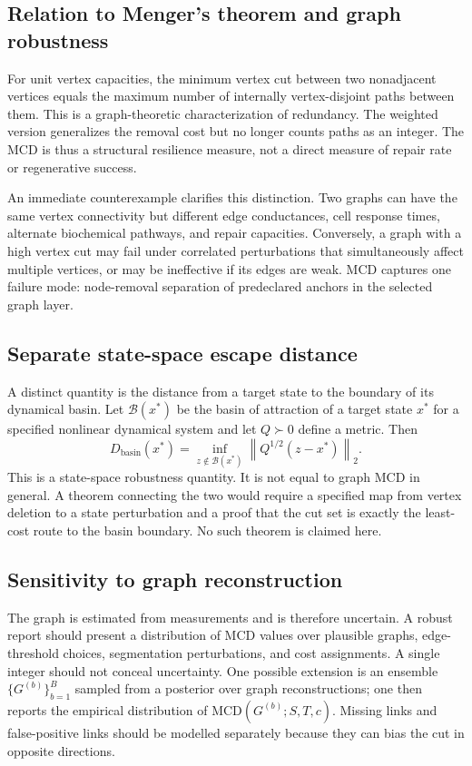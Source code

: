 \documentclass[12pt,a4paper]{article}
\newcommand{\MCD}{\mathrm{MCD}}
\newcommand{\norm}[1]{\left\lVert #1 \right\rVert}
\newcommand{\calB}{\mathcal{B}}
\begin{document}
\subsection{Relation to Menger's theorem and graph robustness}
For unit vertex capacities, the minimum vertex cut between two nonadjacent vertices equals the maximum number of internally vertex-disjoint paths between them. This is a graph-theoretic characterization of redundancy. The weighted version generalizes the removal cost but no longer counts paths as an integer. The MCD is thus a structural resilience measure, not a direct measure of repair rate or regenerative success.

An immediate counterexample clarifies this distinction. Two graphs can have the same vertex connectivity but different edge conductances, cell response times, alternate biochemical pathways, and repair capacities. Conversely, a graph with a high vertex cut may fail under correlated perturbations that simultaneously affect multiple vertices, or may be ineffective if its edges are weak. MCD captures one failure mode: node-removal separation of predeclared anchors in the selected graph layer.

\subsection{Separate state-space escape distance}
A distinct quantity is the distance from a target state to the boundary of its dynamical basin. Let \(\calB(x^*)\) be the basin of attraction of a target state \(x^*\) for a specified nonlinear dynamical system and let \(Q\succ0\) define a metric. Then
\[
D_{\mathrm{basin}}(x^*)=\inf_{z\notin\calB(x^*)}\norm{Q^{1/2}(z-x^*)}_2.
\tag{12}\label{eq:basindist}
\]
This is a state-space robustness quantity. It is not equal to graph MCD in general. A theorem connecting the two would require a specified map from vertex deletion to a state perturbation and a proof that the cut set is exactly the least-cost route to the basin boundary. No such theorem is claimed here.

\subsection{Sensitivity to graph reconstruction}
The graph is estimated from measurements and is therefore uncertain. A robust report should present a distribution of MCD values over plausible graphs, edge-threshold choices, segmentation perturbations, and cost assignments. A single integer should not conceal uncertainty. One possible extension is an ensemble \(\{G^{(b)}\}_{b=1}^B\) sampled from a posterior over graph reconstructions; one then reports the empirical distribution of \(\MCD(G^{(b)};S,T,c)\). Missing links and false-positive links should be modelled separately because they can bias the cut in opposite directions.
\end{document}
